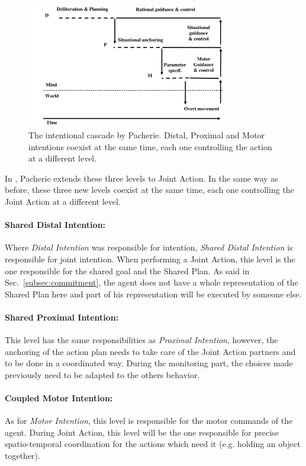 \documentclass[english,a4paper,11pt,twoside]{StyleThese}
\begin{document}
\begin{figure}[!h]
	\centering
    \includegraphics[width=0.8\textwidth]{figs/Chapter1/Pacherie.png}
    \caption{The intentional cascade by Pacherie. Distal, Proximal and Motor intentions coexist at the same time, each one controlling the action at a different level.}
    \label{fig:Pacherie}
\end{figure}

In \cite{pacherie2011phenomenology}, Pacherie extends these three levels to Joint Action. In the same way as before, these three new levels coexist at the same time, each one controlling the Joint Action at a different level.

\paragraph{Shared Distal Intention:}
Where \textit{Distal Intention} was responsible for intention, \textit{Shared Distal Intention} is responsible for joint intention. When performing a Joint Action, this level is the one responsible for the shared goal and the Shared Plan. As said in Sec.~\ref{subsec:commitment}, the agent does not have a whole representation of the Shared Plan here and part of his representation will be executed by someone else.

\paragraph{Shared Proximal Intention:}
This level has the same responsibilities as \textit{Proximal Intention}, however, the anchoring of the action plan needs to take care of the Joint Action partners and to be done in a coordinated way. During the monitoring part, the choices made previously need to be adapted to the others behavior.

\paragraph{Coupled Motor Intention:}
As for \textit{Motor Intention}, this level is responsible for the motor commands of the agent. During Joint Action, this level will be the one responsible for precise spatio-temporal coordination for the actions which need it (e.g. holding an object together).
\end{document}
